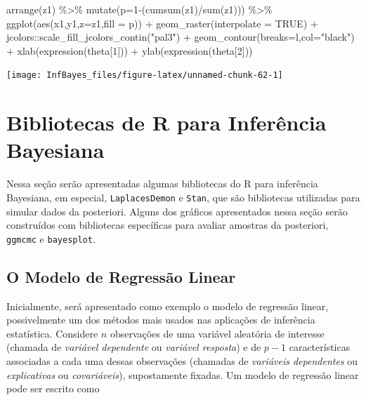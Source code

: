 \documentclass[
]{book}
\newenvironment{Shaded}{\begin{snugshade}}{\end{snugshade}}
\newcommand{\AttributeTok}[1]{\textcolor[rgb]{0.77,0.63,0.00}{#1}}
\newcommand{\ConstantTok}[1]{\textcolor[rgb]{0.00,0.00,0.00}{#1}}
\newcommand{\DecValTok}[1]{\textcolor[rgb]{0.00,0.00,0.81}{#1}}
\newcommand{\FunctionTok}[1]{\textcolor[rgb]{0.00,0.00,0.00}{#1}}
\newcommand{\NormalTok}[1]{#1}
\newcommand{\SpecialCharTok}[1]{\textcolor[rgb]{0.00,0.00,0.00}{#1}}
\newcommand{\StringTok}[1]{\textcolor[rgb]{0.31,0.60,0.02}{#1}}
\begin{document}
\begin{Shaded}
\begin{Highlighting}[]
  \FunctionTok{arrange}\NormalTok{(z1) }\SpecialCharTok{\%\textgreater{}\%} \FunctionTok{mutate}\NormalTok{(}\AttributeTok{p=}\DecValTok{1}\SpecialCharTok{{-}}\NormalTok{(}\FunctionTok{cumsum}\NormalTok{(z1)}\SpecialCharTok{/}\FunctionTok{sum}\NormalTok{(z1))) }\SpecialCharTok{\%\textgreater{}\%}
  \FunctionTok{ggplot}\NormalTok{(}\FunctionTok{aes}\NormalTok{(x1,y1,}\AttributeTok{z=}\NormalTok{z1,}\AttributeTok{fill =}\NormalTok{ p)) }\SpecialCharTok{+}
  \FunctionTok{geom\_raster}\NormalTok{(}\AttributeTok{interpolate =} \ConstantTok{TRUE}\NormalTok{) }\SpecialCharTok{+}
\NormalTok{  jcolors}\SpecialCharTok{::}\FunctionTok{scale\_fill\_jcolors\_contin}\NormalTok{(}\StringTok{"pal3"}\NormalTok{) }\SpecialCharTok{+}
  \FunctionTok{geom\_contour}\NormalTok{(}\AttributeTok{breaks=}\NormalTok{l,}\AttributeTok{col=}\StringTok{"black"}\NormalTok{) }\SpecialCharTok{+}
  \FunctionTok{xlab}\NormalTok{(}\FunctionTok{expression}\NormalTok{(theta[}\DecValTok{1}\NormalTok{])) }\SpecialCharTok{+} \FunctionTok{ylab}\NormalTok{(}\FunctionTok{expression}\NormalTok{(theta[}\DecValTok{2}\NormalTok{]))}
\end{Highlighting}
\end{Shaded}

\begin{center}\texttt{[image: InfBayes\_files/figure-latex/unnamed-chunk-62-1]} \end{center}

\hypertarget{R}{%
\chapter{Bibliotecas de R para Inferência Bayesiana}\label{R}}

Nessa seção serão apresentadas algumas bibliotecas do R para inferência Bayesiana, em especial, \texttt{LaplacesDemon} e \texttt{Stan}, que são bibliotecas utilizadas para simular dados da posteriori. Alguns dos gráficos apresentados nessa seção serão construídos com bibliotecas específicas para avaliar amostras da posteriori, \texttt{ggmcmc} e \texttt{bayesplot}.

\hypertarget{o-modelo-de-regressuxe3o-linear}{%
\section{O Modelo de Regressão Linear}\label{o-modelo-de-regressuxe3o-linear}}

Inicialmente, será apresentado como exemplo o modelo de regressão linear, possivelmente um dos métodos mais usados nas aplicações de inferência estatística. Considere \(n\) observações de uma variável aleatória de interesse (chamada de \emph{variável dependente} ou \emph{variável resposta}) e de \(p-1\) características associadas a cada uma dessas observações (chamadas de \emph{variáveis dependentes} ou \emph{explicativas} ou \emph{covariáveis}), supostamente fixadas. Um modelo de regressão linear pode ser escrito como
\end{document}
